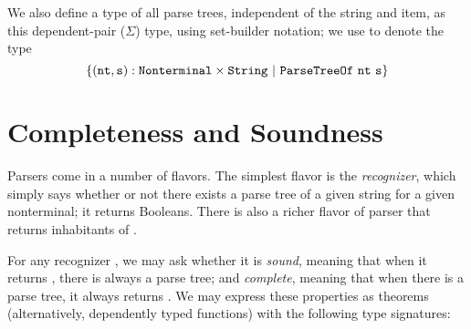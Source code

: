     We also define a type of all parse trees, independent of the string and item, as this dependent-pair ($\Sigma$) type, using set-builder notation; we use  to denote the type
    $$\left\{\oftype{(\farg{nt}, \farg{s})}{\typeprod{\Nonterminal}{\String}}\ \middle|\ \indname{ParseTreeOf}~\farg{nt}~\farg{s}\right\}$$
    
  \section{Completeness and Soundness}\label{sec:correctness}
      Parsers come in a number of flavors.  The simplest flavor is the \emph{recognizer}, which simply says whether or not there exists a parse tree of a given string for a given nonterminal; it returns Booleans.  There is also a richer flavor of parser that returns inhabitants of .
  
      For any recognizer , we may ask whether it is \emph{sound}, meaning that when it returns \true, there is always a parse tree; and \emph{complete}, meaning that when there is a parse tree, it always returns \true.  We may express these properties as theorems (alternatively, dependently typed functions) with the following type signatures:
      
